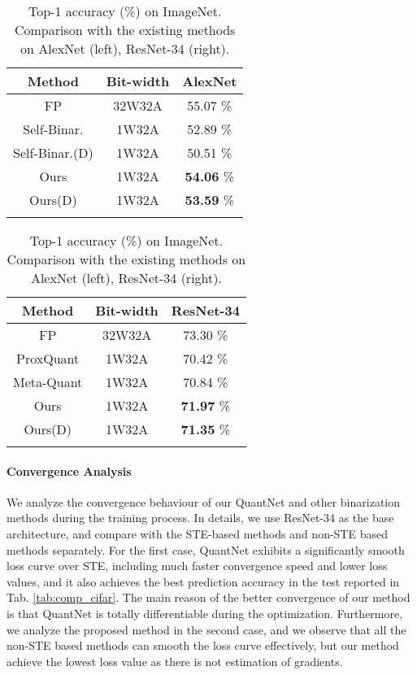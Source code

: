 \documentclass[runningheads]{llncs}
\begin{document}
\begin{table}[htb]
\begin{minipage}{0.48\linewidth}
\centering
\begin{tabular}{ccc}
\hline
Method & Bit-width & AlexNet\\
\hline
FP                                        & 32W32A & 55.07 \% \\
Self-Binar.  \cite{lahoud2019self}        & 1W32A  & 52.89 \% \\
Self-Binar.(D) \cite{lahoud2019self}      & 1W32A  & 50.51 \%\\
Ours                                      & 1W32A  & \textbf{54.06} \% \\
Ours(D)                                   & 1W32A  & \textbf{53.59} \% \\
\hline
\centering
\end{tabular}
\end{minipage}\begin{minipage}{0.48\linewidth}
\centering
\begin{tabular}{ccc}

\hline
Method & Bit-width & ResNet-34 \\
\hline
FP \cite{Qin2020}                         & 32W32A & 73.30 \%  \\
ProxQuant  \cite{bai2019prox}             & 1W32A  & 70.42 \%   \\
Meta-Quant \cite{chen2019meta}            & 1W32A  & 70.84 \%   \\
Ours                                      & 1W32A  & \textbf{71.97} \% \\
Ours(D)                                   & 1W32A  & \textbf{71.35} \% \\
\hline
\centering
\end{tabular}
\end{minipage}
\caption{Top-1 accuracy (\%) on ImageNet. Comparison with the existing methods on AlexNet (left), ResNet-34 (right).}
\label{tab:comp_imagenet}
\end{table}

\paragraph{\textbf{Convergence Analysis}}
We analyze the convergence behaviour of our QuantNet and other binarization methods during the training process.
In details, we use ResNet-34 as the base architecture,
and compare with the STE-based methods and non-STE based methods separately.
For the first case, QuantNet exhibits a significantly smooth loss curve over STE,
including much faster convergence speed and lower loss values,
and it also achieves the best prediction accuracy in the test reported in Tab. \ref{tab:comp_cifar}.
The main reason of the better convergence of our method is that
QuantNet is totally differentiable during the optimization.
Furthermore, we analyze the proposed method in the second case,
and we observe that all the non-STE based methods can smooth the loss curve effectively,
but our method achieve the lowest loss value as there is not estimation of gradients.
\end{document}
